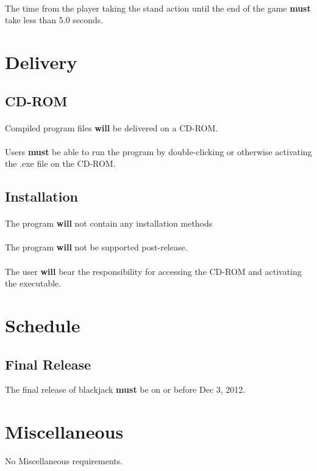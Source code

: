 \documentclass{article}
\begin{document}
\paragraph{}The time from the player taking the stand action until the end of the game \textbf{must} take less than 5.0 seconds.

\section{Delivery}


\subsection{CD-ROM}

\paragraph{}Compiled program files \textbf{will} be delivered on a CD-ROM.

\paragraph{}Users \textbf{must} be able to run the program by double-clicking or otherwise activating the .exe file on the CD-ROM.  


\subsection{Installation}

\paragraph{}The program \textbf{will} not contain any installation methods
\paragraph{}The program \textbf{will} not be supported post-release.
\paragraph{}The user \textbf{will} bear the responsibility for accessing the CD-ROM and activating the executable.


\section{Schedule}
\subsection{Final Release}The final release of blackjack \textbf{must} be on or before Dec 3, 2012.

\section{ Miscellaneous}No Miscellaneous requirements.
\end{document}
